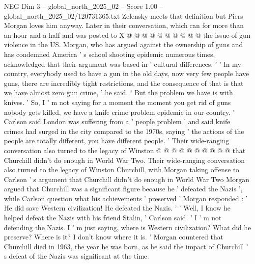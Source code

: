 \begin{textsample}{NEG Dim 3 – global\_north\_2025\_02 – Score 1.00 – global\_north\_2025\_02/120731365.txt}
Zelensky meets that definition but Piers Morgan loves him anyway.
Later in their conversation, which ran for more than an hour and a half and was posted to X @ @ @ @ @ @ @ @ @ @ the issue of gun violence in the US.
Morgan, who has argued against the ownership of guns and has condemned America ' s school shooting epidemic numerous times, acknowledged that their argument was based in ' cultural differences. ' ' In my country, everybody used to have a gun in the old days, now very few people have guns, there are incredibly tight restrictions, and the consequence of that is that we have almost zero gun crime, ' he said. ' But the problem we have is with knives. ' So, I ' m not saying for a moment the moment you get rid of guns nobody gets killed, we have a knife crime problem epidemic in our country. ' Carlson said London was suffering from a ' people problem ' and said knife crimes had surged in the city compared to the 1970s, saying ' the actions of the people are totally different, you have different people. ' Their wide-ranging conversation also turned to the legacy of Winston @ @ @ @ @ @ @ @ @ @ that Churchill didn't do enough in World War Two.
Their wide-ranging conversation also turned to the legacy of Winston Churchill, with Morgan taking offense to Carlson ' s argument that Churchill didn't do enough in World War Two Morgan argued that Churchill was a significant figure because he ' defeated the Nazis ', while Carlson question what his achievements ' preserved ' Morgan responded : ' He did save Western civilization!
He defeated the Nazis. ' ' Well, I know he helped defeat the Nazis with his friend Stalin, ' Carlson said. ' I ' m not defending the Nazis.
I ' m just saying, where is Western civilization?
What did he preserve?
Where is it?
I don't know where it is. ' Morgan countered that Churchill died in 1963, the year he was born, as he said the impact of Churchill ' s defeat of the Nazis was significant at the time.

\end{textsample}
